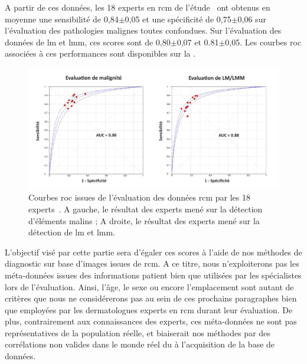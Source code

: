 A partir de ces données, les 18 experts en \gls{rcm} de l'étude~\cite{Cinotti2018} ont obtenus en moyenne une sensibilité de 0,84$\pm$0,05 et une spécificité de 0,75$\pm$0,06 sur l'évaluation des pathologies malignes toutes confondues. Sur l'évaluation des données de \gls{lm} et \gls{lmm}, ces scores sont de 0,80$\pm$0,07 et 0.81$\pm$0,05. Les courbes \gls{roc} associées à ces performances sont disponibles sur la .\par

\begin{figure}[H]
    \begin{center}
        \includegraphics[width=\linewidth]{contents/iii_preamble_microscopy/resources/results_rcm_experts.pdf}
        \caption{Courbes \gls{roc} issues de l'évaluation des données \gls{rcm} par les 18 experts~\cite{Cinotti2018}. A gauche, le résultat des experts mené sur la détection d'éléments malins ; A droite, le résultat des experts mené sur la détection de \gls{lm} et \gls{lmm}.}
        \label{fig:results_rcm_experts}
    \end{center} 
\end{figure}\par

L'objectif visé par cette partie sera d'égaler ces scores à l'aide de nos méthodes de diagnostic sur base d'images issues de \gls{rcm}. A ce titre, nous n'exploiterons pas les méta-données issues des informations patient bien que utilisées par les spécialistes lors de l'évaluation. Ainsi, l'âge, le sexe ou encore l'emplacement sont autant de critères que nous ne considérerons pas au sein de ces prochains paragraphes bien que employées par les dermatologues experts en \gls{rcm} durant leur évaluation. De plus, contrairement aux connaissances des experts, ces méta-données ne sont pas représentatives de la population réelle, et biaiserait nos méthodes par des corrélations non valides dans le monde réel du à l'acquisition de la base de données.\par

